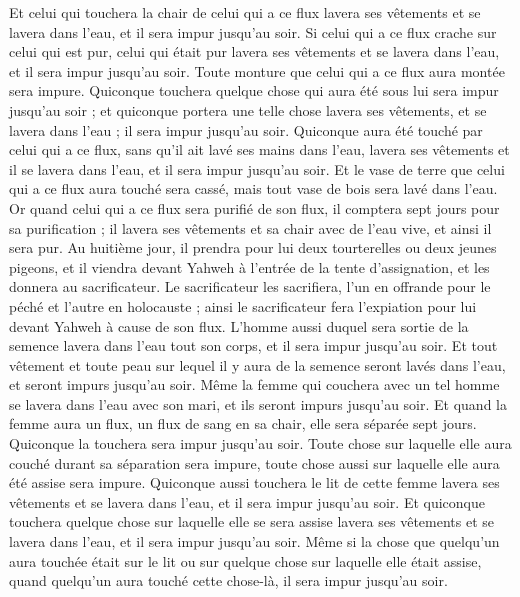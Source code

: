 \begin{multicols}{2}
Et celui qui touchera la chair de celui qui a ce flux lavera ses vêtements et se lavera dans l'eau, et il sera impur jusqu'au soir.
Si celui qui a ce flux crache sur celui qui est pur, celui qui était pur lavera ses vêtements et se lavera dans l'eau, et il sera impur jusqu'au soir.
Toute monture que celui qui a ce flux aura montée sera impure.
Quiconque touchera quelque chose qui aura été sous lui sera impur jusqu'au soir ; et quiconque portera une telle chose lavera ses vêtements, et se lavera dans l'eau ; il sera impur jusqu'au soir.
Quiconque aura été touché par celui qui a ce flux, sans qu'il ait lavé ses mains dans l'eau, lavera ses vêtements et il se lavera dans l'eau, et il sera impur jusqu'au soir.
Et le vase de terre que celui qui a ce flux aura touché sera cassé, mais tout vase de bois sera lavé dans l'eau.
Or quand celui qui a ce flux sera purifié de son flux, il comptera sept jours pour sa purification ; il lavera ses vêtements et sa chair avec de l'eau vive, et ainsi il sera pur.
Au huitième jour, il prendra pour lui deux tourterelles ou deux jeunes pigeons, et il viendra devant Yahweh à l'entrée de la tente d'assignation, et les donnera au sacrificateur.
Le sacrificateur les sacrifiera, l'un en offrande pour le péché et l'autre en holocauste ; ainsi le sacrificateur fera l’expiation pour lui devant Yahweh à cause de son flux.
L'homme aussi duquel sera sortie de la semence lavera dans l'eau tout son corps, et il sera impur jusqu'au soir.
Et tout vêtement et toute peau sur lequel il y aura de la semence seront lavés dans l'eau, et seront impurs jusqu'au soir.
Même la femme qui couchera avec un tel homme se lavera dans l'eau avec son mari, et ils seront impurs jusqu'au soir.
Et quand la femme aura un flux, un flux de sang en sa chair, elle sera séparée sept jours. Quiconque la touchera sera impur jusqu'au soir.
Toute chose sur laquelle elle aura couché durant sa séparation sera impure, toute chose aussi sur laquelle elle aura été assise sera impure.
Quiconque aussi touchera le lit de cette femme lavera ses vêtements et se lavera dans l'eau, et il sera impur jusqu'au soir.
Et quiconque touchera quelque chose sur laquelle elle se sera assise lavera ses vêtements et se lavera dans l'eau, et il sera impur jusqu'au soir.
Même si la chose que quelqu'un aura touchée était sur le lit ou sur quelque chose sur laquelle elle était assise, quand quelqu'un aura touché cette chose-là, il sera impur jusqu'au soir.

\end{multicols}
